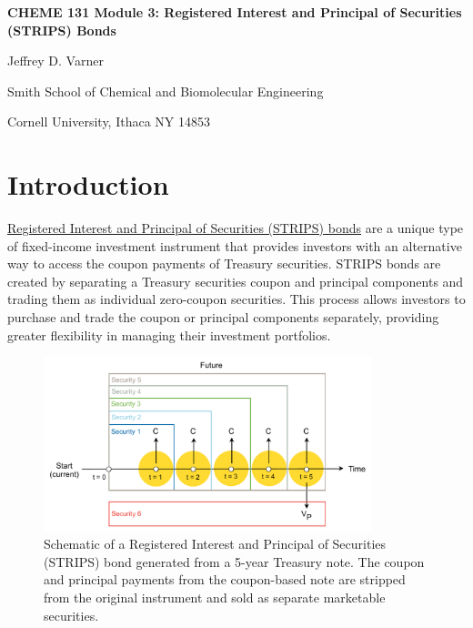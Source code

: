 \documentclass[11pt]{article}
\theoremstyle{definition}
\begin{document}
{\par\centering\textbf{\Large CHEME 131 Module 3: Registered Interest and Principal of Securities (STRIPS) Bonds}}
\vspace{0.2in}
{\par \centering \large{Jeffrey D. Varner}}
\vspace{0.05in}
{\par \centering \large{Smith School of Chemical and Biomolecular Engineering}}
{\par \centering \large{Cornell University, Ithaca NY 14853}}

\date{}
\thispagestyle{empty}

\setcounter{page}{1}

\section*{Introduction}
\href{https://en.wikipedia.org/wiki/United_States_Treasury_security#STRIPS}{Registered Interest and Principal of Securities (STRIPS) bonds} are a 
unique type of fixed-income investment instrument that provides investors with an alternative way to access the coupon payments of 
Treasury securities. STRIPS bonds are created by separating a Treasury securities coupon and principal components and trading them as individual 
zero-coupon securities. This process allows investors to purchase and trade the coupon or principal components separately, 
providing greater flexibility in managing their investment portfolios.

\begin{figure}[h]
    \centering
    \includegraphics[width=0.85\textwidth]{./figs/Fig-STRIPS-Schematic.pdf}
    \caption{Schematic of a Registered Interest and Principal of Securities (STRIPS) bond generated from a 5-year Treasury note. The coupon and principal payments from the coupon-based 
	note are stripped from the original instrument and sold as separate marketable securities.}\label{fig:strips-bond-schematic}
\end{figure}
\end{document}
